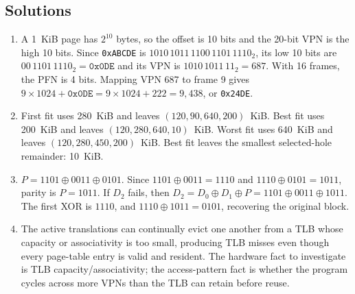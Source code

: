 \documentclass[11pt]{article}
\begin{document}
\subsection*{Solutions}
\begingroup\small\raggedright
\begin{enumerate}
  \item A 1~KiB page has $2^{10}$ bytes, so the offset is 10 bits and the
        20-bit VPN is the high 10 bits. Since \texttt{0xABCDE} is
        $1010\,1011\,1100\,1101\,1110_2$, its low 10 bits are
      $00\,1101\,1110_2=\texttt{0x0DE}$ and its VPN is
        $1010\,1011\,11_2=687$. With 16 frames, the PFN is 4 bits. Mapping
        VPN 687 to frame 9 gives
      $9\times1024+\texttt{0x0DE}=9\times1024+222=9{,}438$,
      or \texttt{0x24DE}.
  \item First fit uses 280~KiB and leaves
        $(120,90,640,200)$~KiB. Best fit uses 200~KiB and leaves
        $(120,280,640,10)$~KiB. Worst fit uses 640~KiB and leaves
        $(120,280,450,200)$~KiB. Best fit leaves the smallest selected-hole
        remainder: 10~KiB.
  \item $P=1101\oplus0011\oplus0101$. Since
        $1101\oplus0011=1110$ and $1110\oplus0101=1011$, parity is
        $P=1011$. If $D_2$ fails, then
        $D_2=D_0\oplus D_1\oplus P=1101\oplus0011\oplus1011$.
        The first XOR is $1110$, and $1110\oplus1011=0101$, recovering the
        original block.
  \item The active translations can continually evict one another from a
        TLB whose capacity or associativity is too small, producing TLB misses
        even though every page-table entry is valid and resident. The hardware
        fact to investigate is TLB capacity/associativity; the access-pattern
        fact is whether the program cycles across more VPNs than the TLB can
        retain before reuse.
\end{enumerate}
\endgroup



\end{document}
